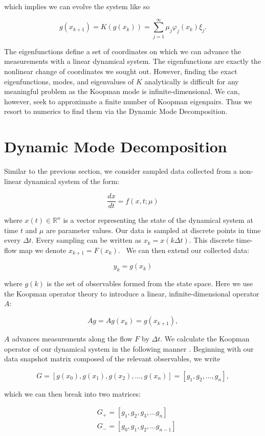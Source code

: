 \noindent which implies we can evolve the system like so

$$
g(x_{k+1}) = K(g(x_k)) = \sum^{\infty}_{j=1} \mu_j \varphi_j(x_k) \xi_j.
$$

\noindent The eigenfunctions define a set of coordinates on which we can advance the measurements with a 
linear dynamical system. The eigenfunctions are exactly the nonlinear change of coordinates we sought out.
 However, finding the exact eigenfunctions, modes, and eigenvalues of $K$ analytically
is difficult for any meaningful problem as the Koopman mode is infinite-dimensional. We can, however, seek to approximate
a finite number of Koopman eigenpairs. Thus we resort to
numerics to find them via the Dynamic Mode Decomposition.


\section{Dynamic Mode Decomposition}
Similar to the previous section, we consider sampled data collected from a non-linear dynamical system
of the form:

$$
\frac{dx}{dt} = f(x,t; \mu)
$$

\noindent where $x(t)\in \mathbb{R}^{n}$ is a vector representing the state of the dynamical system
at time $t$ and $\mu$ are parameter values.
 Our data is sampled at discrete points in time every $\Delta t$. Every sampling can be written as $x_{k} = x(k \Delta t)$. This 
discrete time-flow map we denote $x_{k+1} = F(x_k)$. \
We can then extend our collected data:

$$
y_k = g(x_k)
$$

\noindent where $g(k)$ is the set of observables formed from the state space. 
Here we use the Koopman operator theory to introduce a
 linear, infinite-dimensional operator $A$:

$$
A g = A g(x_k) = g(x_{k+1}),
$$

\noindent $A$ advances measurements along the flow $F$ by $\Delta t$.
We calculate the Koopman operator of our dynamical system in the following manner \cite{brunton2021modern}.
Beginning with our data snapshot matrix composed of the relevant observables, we write

$$
G = [g(x_0), g(x_1), g(x_2), \dots ,g(x_n)] = [g_1,g_2,\dots, g_n],
$$

\noindent which we can then break into two matrices:

\begin{align*}
    & G_+ = [g_1, g_2, g_3, \dots g_n]\\
    & G_- = [g_0, g_1, g_2, \dots g_{n-1}]\\\
\end{align*}

